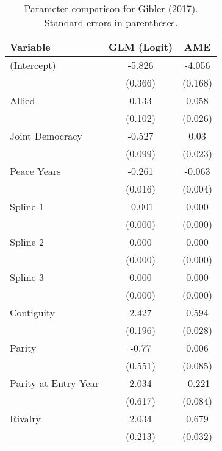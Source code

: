 \begin{table}[ht]
\centering
\begingroup\normalsize
\begin{tabular}{lcc}
 Variable & GLM (Logit) & AME \\ 
  \hline
\hline
(Intercept) & -5.826 & -4.056 \\ 
   & (0.366) & (0.168) \\ 
  Allied & 0.133 & 0.058 \\ 
   & (0.102) & (0.026) \\ 
  Joint Democracy & -0.527 & 0.03 \\ 
   & (0.099) & (0.023) \\ 
  Peace Years & -0.261 & -0.063 \\ 
   & (0.016) & (0.004) \\ 
  Spline 1 & -0.001 & 0.000 \\ 
   & (0.000) & (0.000) \\ 
  Spline 2 & 0.000 & 0.000 \\ 
   & (0.000) & (0.000) \\ 
  Spline 3 & 0.000 & 0.000 \\ 
   & (0.000) & (0.000) \\ 
  Contiguity & 2.427 & 0.594 \\ 
   & (0.196) & (0.028) \\ 
  Parity & -0.77 & 0.006 \\ 
   & (0.551) & (0.085) \\ 
  Parity at Entry Year & 2.034 & -0.221 \\ 
   & (0.617) & (0.084) \\ 
  Rivalry & 2.034 & 0.679 \\ 
   & (0.213) & (0.032) \\ 
   \hline
\hline
\end{tabular}
\endgroup
\caption{Parameter comparison for Gibler (2017). Standard errors in parentheses.} 
\label{tab:appendix_tableB3_coef}
\end{table}
